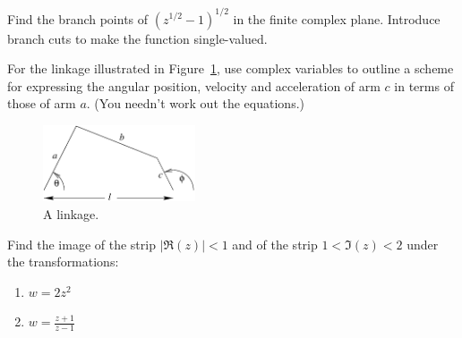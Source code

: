 {%
\begin{Exercise}
  \label{exercise bp z12112}
  Find the branch points of $\left( z^{1/2} - 1 \right)^{1/2}$ in the finite complex
  plane.  Introduce branch cuts to make the function single-valued.

\end{Exercise}






\begin{Exercise}
  \label{exercise linkage}
  For the linkage illustrated in Figure~\ref{linkage}, 
  use complex variables to outline a scheme for 
  expressing the angular position, velocity and acceleration of arm $c$ in
  terms of those of arm $a$.  (You needn't work out the equations.)
  \begin{figure}[htbp!]
    \begin{center}
      \includegraphics[width=0.4\textwidth]{fcv/function/linkage}
    \end{center}
    \caption{A linkage.}
    \label{linkage}
  \end{figure}

\end{Exercise}







\begin{Exercise}
  \label{exercise image 2z2}
  Find the image of the strip $|\Re(z)| < 1$ and of the strip $1 < \Im(z) < 2$
  under the transformations:
  \begin{enumerate}
  \item
    $w = 2 z^2$
  \item
    $w = \frac{z + 1}{z - 1}$
  \end{enumerate}

\end{Exercise}









}
